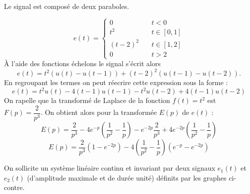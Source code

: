 \question{}
Le signal est composé de deux paraboles. 
\begin{figure}[!h]
    \centering
    
\end{figure}
\[
e(t)=
\begin{cases}
    0&\quad t<0\\
    t^2&\quad t\in[0,1]\\
    (t-2)^2&\quad t\in[1,2]\\
    0&\quad t>2
\end{cases}
\]
\`A l'aide des fonctions échelons le signal s'écrit alors 
\[
    e(t)=t^2\left(u(t)-u(t-1)\right)+(t-2)^2\left(u(t-1)-u(t-2)\right).
\]
En regroupant les termes on peut réecrire cette expression sous la forme :
\[
    e(t)=t^2u(t)-4(t-1)u(t-1)-t^2u(t-2)+4(t-1)u(t-2)
\]
\question{}
On rapelle que la transformé de Laplace de la fonction $f(t)=t^2$ 
est $F(p)=\dfrac{2}{p^3}$. On obtient alors pour la transformée $E(p)$ de $e(t)$ :
\[
    E(p)=\dfrac{2}{p^3}-4e^{-p}\left(\dfrac{1}{p^2}-\dfrac{1}{p}\right)
        -e^{-2p}\dfrac{2}{p^3}+4e^{-2p}\left(\dfrac{1}{p^2}-\dfrac{1}{p}\right)
\]
\[
    E(p)=\dfrac{2}{p^3}\left(1-e^{-2p}\right)
        -4\left(\dfrac{1}{p^2}-\dfrac{1}{p}\right)\left(e^{-p}-e^{-2p}\right)
\]


On sollicite un système linéaire continu et invariant par deux signaux $e_1(t)$ 
et $e_2(t)$ (d'amplitude maximale et de durée unité) définits 
par les graphes ci-contre.

